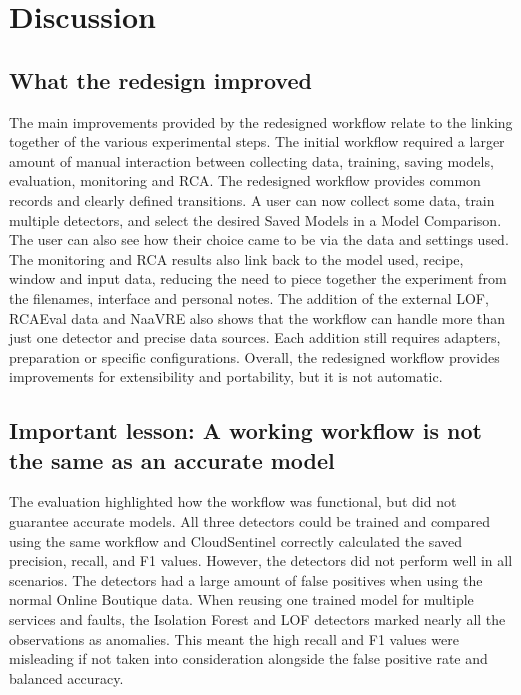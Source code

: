 \section{Discussion}

\subsection{What the redesign improved}

The main improvements provided by the redesigned workflow relate to the linking together of the various experimental steps. The initial workflow required a larger amount of manual interaction between collecting data, training, saving models, evaluation, monitoring and RCA. The redesigned workflow provides common records and clearly defined transitions. A user can now collect some data, train multiple detectors, and select the desired Saved Models in a Model Comparison. The user can also see how their choice came to be via the data and settings used. The monitoring and RCA results also link back to the model used, recipe, window and input data, reducing the need to piece together the experiment from the filenames, interface and personal notes. The addition of the external LOF, RCAEval data and NaaVRE also shows that the workflow can handle more than just one detector and precise data sources. Each addition still requires adapters, preparation or specific configurations. Overall, the redesigned workflow provides improvements for extensibility and portability, but it is not automatic.

\subsection{Important lesson: A working workflow is not the same as an accurate model}

The evaluation highlighted how the workflow was functional, but did not guarantee accurate models. All three detectors could be trained and compared using the same workflow and CloudSentinel correctly calculated the saved precision, recall, and F1 values. However, the detectors did not perform well in all scenarios. The detectors had a large amount of false positives when using the normal Online Boutique data. When reusing one trained model for multiple services and faults, the Isolation Forest and LOF detectors marked nearly all the observations as anomalies. This meant the high recall and F1 values were misleading if not taken into consideration alongside the false positive rate and balanced accuracy.

